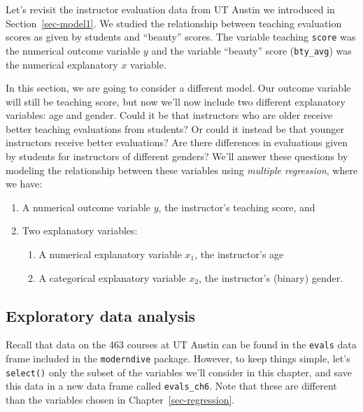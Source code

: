 \documentclass[
  letterpaper,
  DIV=11,
  numbers=noendperiod]{scrreprt}
\providecommand{\tightlist}{%
  \setlength{\itemsep}{0pt}\setlength{\parskip}{0pt}}\usepackage{longtable,booktabs,array}
\theoremstyle{definition}
\theoremstyle{remark}
\begin{document}
Let's revisit the instructor evaluation data from UT Austin we
introduced in Section~\ref{sec-model1}. We studied the relationship
between teaching evaluation scores as given by students and ``beauty''
scores. The variable teaching \texttt{score} was the numerical outcome
variable \(y\) and the variable ``beauty'' score (\texttt{bty\_avg}) was
the numerical explanatory \(x\) variable.

In this section, we are going to consider a different model. Our outcome
variable will still be teaching score, but now we'll now include two
different explanatory variables: age and gender. Could it be that
instructors who are older receive better teaching evaluations from
students? Or could it instead be that younger instructors receive better
evaluations? Are there differences in evaluations given by students for
instructors of different genders? We'll answer these questions by
modeling the relationship between these variables using \emph{multiple
regression}, where we have:

\begin{enumerate}
\def\labelenumi{\arabic{enumi}.}
\tightlist
\item
  A numerical outcome variable \(y\), the instructor's teaching score,
  and
\item
  Two explanatory variables:

  \begin{enumerate}
  \def\labelenumii{\arabic{enumii}.}
  \tightlist
  \item
    A numerical explanatory variable \(x_1\), the instructor's age
  \item
    A categorical explanatory variable \(x_2\), the instructor's
    (binary) gender.
  \end{enumerate}
\end{enumerate}

\hypertarget{sec-model4EDA}{%
\subsection{Exploratory data analysis}\label{sec-model4EDA}}

Recall that data on the 463 courses at UT Austin can be found in the
\texttt{evals} data frame included in the \texttt{moderndive} package.
However, to keep things simple, let's \texttt{select()} only the subset
of the variables we'll consider in this chapter, and save this data in a
new data frame called \texttt{evals\_ch6}. Note that these are different
than the variables chosen in Chapter~\ref{sec-regression}.
\end{document}
